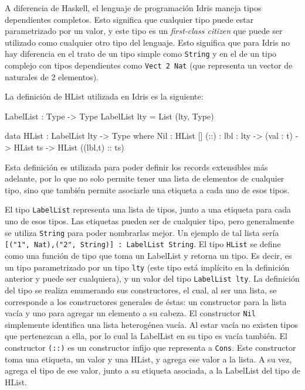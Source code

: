 A diferencia de Haskell, el lenguaje de programación Idris maneja tipos dependientes completos. Esto significa que cualquier tipo puede estar parametrizado por un valor, y este tipo es un \textit{first-class citizen} que puede ser utilizado como cualquier otro tipo del lenguaje. Esto significa que para Idris no hay diferencia en el trato de un tipo simple como \texttt{String} y en el de un tipo complejo con tipos dependientes como \texttt{Vect 2 Nat} (que representa un vector de naturales de 2 elementos).

La definición de HList utilizada en Idris es la siguiente:

\begin{code}
LabelList : Type -> Type
LabelList lty = List (lty, Type)

data HList : LabelList lty -> Type where
  Nil : HList []
  (::) : {lbl : lty} -> (val : t) -> HList ts -> HList ((lbl,t) :: ts)
\end{code}

Esta definición es utilizada para poder definir los records extensibles más adelante, por lo que no solo permite tener una lista de elementos de cualquier tipo, sino que también permite asociarle una etiqueta a cada uno de esos tipos.

El tipo \texttt{LabelList} representa una lista de tipos, junto a una etiqueta para cada uno de esos tipos. Las etiquetas pueden ser de cualquier tipo, pero generalmente se utiliza \texttt{String} para poder nombrarlas mejor. Un ejemplo de tal lista sería \texttt{[("1", Nat),("2", String)] : LabelList String}.
El tipo \texttt{HList} se define como una función de tipo que toma un LabelList y retorna un tipo. Es decir, es un tipo parametrizado por un tipo \texttt{lty} (este tipo está implícito en la definición anterior y puede ser cualquiera), y un valor del tipo \texttt{LabelList lty}. La definición del tipo se realiza enumerando sus constructores, el cual, al ser una lista, se corresponde a los constructores generales de éstas: un constructor para la lista vacía y uno para agregar un elemento a su cabeza.
El constructor \texttt{Nil} simplemente identifica una lista heterogénea vacía. Al estar vacía no existen tipos que pertenezcan a ella, por lo cual la LabelList en su tipo es vacía también.
El constructor \texttt{(::)} es un constructor infijo que representa a \texttt{Cons}. Este constructor toma una etiqueta, un valor y una HList, y agrega ese valor a la lista. A su vez, agrega el tipo de ese valor, junto a su etiqueta asociada, a la LabelList del tipo de HList.

